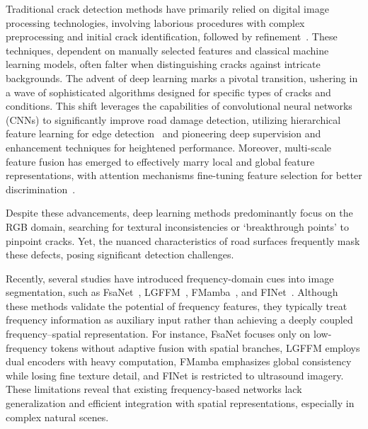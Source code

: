 \documentclass[journal]{IEEEtran}
\begin{document}
Traditional crack detection methods have primarily relied on digital image processing technologies, involving laborious procedures with complex preprocessing and initial crack identification, followed by refinement~\cite{DBLP:conf/icarcv/DinhHL16,DBLP:journals/tits/OliveiraC13}. These techniques, dependent on manually selected features and classical machine learning models, often falter when distinguishing cracks against intricate backgrounds. The advent of deep learning marks a pivotal transition, ushering in a wave of sophisticated algorithms designed for specific types of cracks and conditions. This shift leverages the capabilities of convolutional neural networks (CNNs) to significantly improve road damage detection, utilizing hierarchical feature learning for edge detection~\cite{DBLP:journals/ijon/LiuYLXL19,DBLP:journals/tits/YangZYPML20} and pioneering deep supervision and enhancement techniques for heightened performance. Moreover, multi-scale feature fusion has emerged to effectively marry local and global feature representations, with attention mechanisms fine-tuning feature selection for better discrimination~\cite{DBLP:journals/wicomm/HuHYHL21,DBLP:journals/cacie/QuqaLL23,li2018automatic}.

Despite these advancements, deep learning methods predominantly focus on the RGB domain, searching for textural inconsistencies or `breakthrough points' to pinpoint cracks. Yet, the nuanced characteristics of road surfaces frequently mask these defects, posing significant detection challenges. 





Recently, several studies have introduced frequency-domain cues into image segmentation, such as FsaNet~\cite{DBLP:journals/tip/ZhangPG23}, LGFFM~\cite{11129883TMI}, FMamba~\cite{DBLP:journals/tim/LiuLLWZS25}, and FINet~\cite{DBLP:journals/tcsv/WangZZGY25}. 
Although these methods validate the potential of frequency features, they typically treat frequency information as auxiliary input rather than achieving a deeply coupled frequency–spatial representation. 
For instance, FsaNet focuses only on low-frequency tokens without adaptive fusion with spatial branches, LGFFM employs dual encoders with heavy computation, FMamba emphasizes global consistency while losing fine texture detail, and FINet is restricted to ultrasound imagery. 
These limitations reveal that existing frequency-based networks lack generalization and efficient integration with spatial representations, especially in complex natural scenes.
\end{document}
